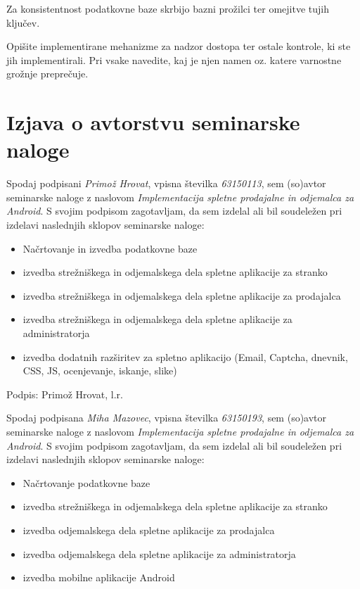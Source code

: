 \documentclass[a4paper,12pt]{report}
\newcommand{\naslov}     {Implementacija spletne prodajalne in odjemalca za Android}
\newcommand{\prviavtor}  {Primož Hrovat}
\newcommand{\prviindeks} {63150113}
\newcommand{\drugiavtor} {Miha Mazovec}
\newcommand{\drugiindeks}{63150193}
\begin{document}
Za konsistentnost podatkovne baze skrbijo bazni prožilci ter omejitve tujih ključev.

Opišite implementirane mehanizme za nadzor dostopa ter ostale kontrole, ki ste jih implementirali. Pri vsake navedite, kaj je njen namen oz. katere varnostne grožnje preprečuje.

\chapter{Izjava o avtorstvu seminarske naloge}

Spodaj podpisani \textit{\prviavtor}, vpisna številka \textit{\prviindeks}, sem (so)avtor seminarske naloge z naslovom \textit{\naslov}. S svojim podpisom zagotavljam, da sem izdelal ali bil soudeležen pri izdelavi naslednjih sklopov seminarske naloge:
\begin{itemize}
    \item Načrtovanje in izvedba podatkovne baze
    \item izvedba strežniškega in odjemalskega dela spletne aplikacije za stranko
    \item izvedba strežniškega in odjemalskega dela spletne aplikacije za prodajalca
    \item izvedba strežniškega in odjemalskega dela spletne aplikacije za administratorja
    \item izvedba dodatnih razširitev za spletno aplikacijo (Email, Captcha, dnevnik, CSS, JS, ocenjevanje, iskanje, slike)
\end{itemize}

Podpis: {\prviavtor}, l.r.

\newpage

Spodaj podpisana \textit{\drugiavtor}, vpisna številka \textit{\drugiindeks}, sem (so)avtor seminarske naloge z naslovom \textit{\naslov}. S svojim podpisom zagotavljam, da sem izdelal ali bil soudeležen pri izdelavi naslednjih sklopov seminarske naloge:
\begin{itemize}
    \item Načrtovanje podatkovne baze
	 \item izvedba strežniškega in odjemalskega dela spletne aplikacije za stranko
	 \item izvedba odjemalskega dela spletne aplikacije za prodajalca
	 \item izvedba odjemalskega dela spletne aplikacije za administratorja
	 \item izvedba mobilne aplikacije Android
\end{itemize}
\end{document}
